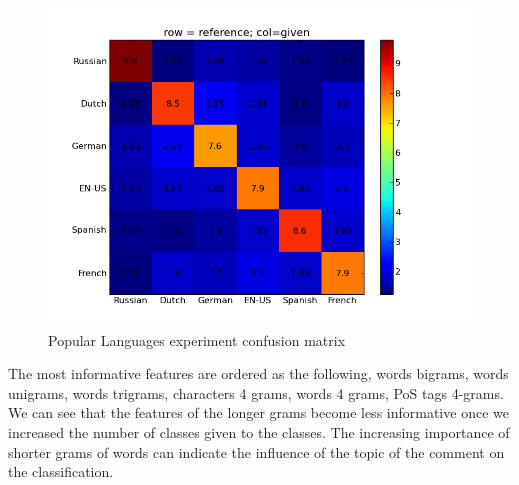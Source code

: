 \documentclass[11pt]{article}
\begin{document}
\begin{figure}[htp]
\centering
\includegraphics[scale=0.45]{popular_cfm.png}
\caption{Popular Languages experiment confusion matrix}
\label{pop_cfm}
\end{figure}

The most informative features are ordered as the following, words bigrams, words unigrams, words trigrams, characters 4 grams, words 4 grams, PoS tags 4-grams. We can see that the features of the longer grams become less informative once we increased the number of classes given to the classes. The increasing importance of shorter grams of words can indicate the influence of the topic of the comment on the classification.
\end{document}
